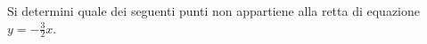 Si determini quale dei seguenti punti non appartiene alla retta di equazione 
\(\displaystyle y = - \frac{3}{2} x\).